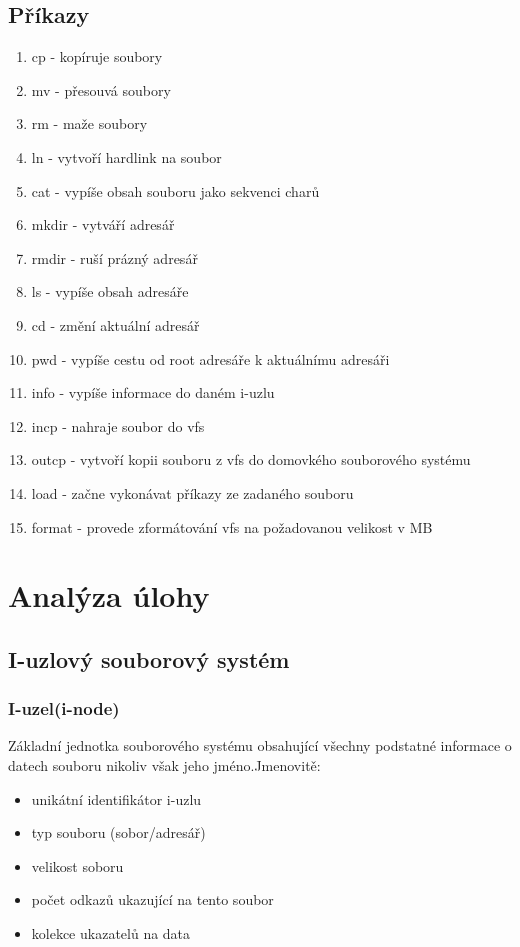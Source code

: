 \documentclass[12pt, a4paper]{report}
\begin{document}
\section{Příkazy}
\begin{enumerate}
 \item cp - kopíruje soubory
 \item mv - přesouvá soubory
 \item rm - maže soubory
 \item ln - vytvoří hardlink na soubor
 \item cat - vypíše obsah souboru jako sekvenci charů
 
 \item mkdir - vytváří adresář
 \item rmdir - ruší prázný adresář
 \item ls - vypíše obsah adresáře
 

 \item cd - změní aktuální adresář
 \item pwd - vypíše cestu od root adresáře k aktuálnímu adresáři
 \item info - vypíše informace do daném i-uzlu
 
 \item incp - nahraje soubor do vfs
 \item outcp - vytvoří kopii souboru z vfs do domovkého souborového systému
 \item load - začne vykonávat příkazy ze zadaného souboru
 \item format - provede zformátování vfs na požadovanou velikost v MB
\end{enumerate}





\chapter{Analýza úlohy}
\section{I-uzlový souborový systém}
\subsection{I-uzel(i-node)}
Základní jednotka souborového systému obsahující všechny podstatné informace o datech souboru nikoliv však jeho jméno.Jmenovitě:
\begin{itemize}
 \item unikátní identifikátor i-uzlu 
 \item typ souboru (sobor/adresář)
 \item velikost soboru
 \item počet odkazů ukazující na tento soubor
 \item kolekce ukazatelů na data
\end{itemize}
\end{document}
